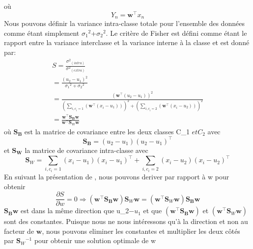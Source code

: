 où
\begin{equation}
  Y{_n}  = \textbf{w}^\intercal x{_n}
\end{equation}
 Nous pouvons définir la variance intra-classe totale pour l'ensemble des données comme étant simplement $\sigma{_1}^2$+$\sigma{_2}^2$. Le critère de Fisher est défini comme étant le rapport entre la variance interclasse et la variance interne à la classe et est donné par:\\
 \begin{equation}
   \begin{split}
     S  =\frac{\sigma^2{_(intra)}}{\sigma^2{_(extra)}}  \\  =\frac{(u{_2} -u{_1})^2}{\sigma{_1}^2+\sigma{_2}^2} \\  =\frac{(\textbf{w}^\intercal (u{_2} -u{_1}))^2}
     {
     (\sum_{i ,c{_i}=1}(\textbf{w}^\intercal(x{_i} -u{_1})))^2+ (\sum_{i ,c{_i}=2}(\textbf{w}^\intercal(x{_i} -u{_2})))^2
     } \\  =\frac{\textbf{w}^\intercal \mathbf{S{_B}}\mathbf{w}}{\textbf{w}^\intercal \mathbf{S}{_W}\mathbf{w}}
   \end{split}

 \end{equation}
 où $\mathbf{S{_B}}$ est la matrice de covariance entre les deux classes C{_1} $ et {C_2} $ avec \\
 \begin{equation}
   \mathbf{S{_B}}=(u{_2}-u{_1})(u{_2}-u{_1})^\intercal
 \end{equation}
 et $\mathbf{S{_W}}$ la matrice de covariance intra-classe avec
 \begin{equation}
   \mathbf{S}{_W} =\sum_{i ,c{_i}=1}(x{_i}-u{_1})(x{_i}-u{_1})^\intercal +  \sum_{i ,c{_i}=2}(x{_i}-u{_2})(x{_i}-u{_2})^\intercal
 \end{equation}
 En suivant la présentation de \cite{7}, nous pouvons deriver  par rapport à w pour obtenir
 \begin{equation}
   \frac{\partial{S}}{\partial{w}}=0 \Rightarrow (\textbf{w}^\intercal \mathbf{S{_B}}\mathbf{w})\mathbf{S}{_W}\mathbf{w}= (\textbf{w}^\intercal \mathbf{S}{_W}\mathbf{w})\mathbf{S{_B}}\mathbf{w}
 \end{equation}
 $\mathbf{S{_B}} \mathbf{w} $  est dans la même direction que  u{_2}$ -u{_1}$ et que $(\textbf{w}^\intercal \mathbf{S{_B}}\mathbf{w}) $ et  $(\textbf{w}^\intercal \mathbf{S}{_W}\mathbf{w})$ sont des constantes.
Puisque nous ne nous intéressons qu'à la direction et non au facteur  de $\mathbf{w}$, nous pouvons eliminer  les constantes et multiplier les deux côtés par  $\mathbf{S}{_W}^{-1}$ pour obtenir une solution optimale de w
